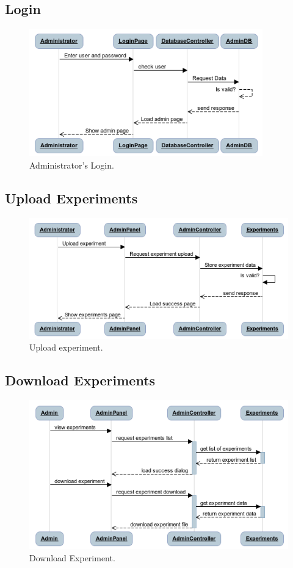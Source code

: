 \documentclass[a4paper,12pt,oneside]{report}
\begin{document}
\subsection{Login}
\begin{figure}[!hp]
  \begin{center}
   \includegraphics[width=10.1cm]{pics/loginse.png}
  \end{center}
\caption{Administrator's Login.}
\end{figure}
\newpage
\subsection{Upload Experiments}
\begin{figure}[!hp]
  \begin{center}
   \includegraphics[width=11.3cm]{pics/upload.png}
  \end{center}
\caption{Upload experiment.}
\end{figure}


\subsection{Download Experiments}
\begin{figure}[!hp]
  \begin{center}
   \includegraphics[width=11.6cm]{pics/download_experiments.png}
  \end{center}
\caption{Download Experiment.}
\end{figure}
\end{document}
